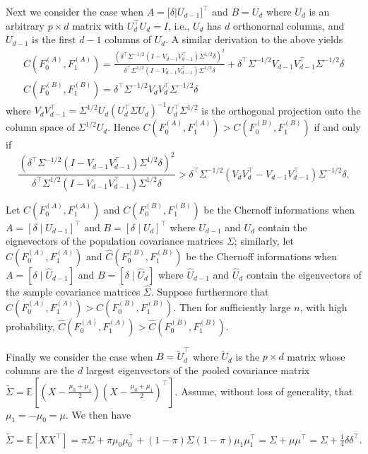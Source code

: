 \documentclass[10pt]{article}
\begin{document}
 Next we consider the case when $A = \bigl[ \delta | U_{d-1} \bigr]^{\top}$ and $B = U_{d}$ where $U_{d}$ is an arbitrary $p \times d$ matrix with $U_d^{\top} U_d = I$, i.e., $U_d$ has $d$ orthonornal columns, and $U_{d-1}$ is the first $d-1$ columns of $U_d$. A similar derivation to the above yields
 \begin{gather}
 C(F_0^{(A)}, F_1^{(A)}) = \frac{(\delta^{\top} \Sigma^{-1/2} (I - V_{d-1} V_{d-1}^{\top}) \Sigma^{1/2} \delta)^2}{\delta^{\top} \Sigma^{1/2} (I - V_{d-1} V_{d-1}^{\top}) \Sigma^{1/2} \delta} + \delta^{\top} \Sigma^{-1/2} V_{d-1} V_{d-1}^{\top} \Sigma^{-1/2} \delta \\
 C(F_0^{(B)}, F_1^{(B)}) = \delta^{\top} \Sigma^{-1/2} V_d V_d^{\top} \Sigma^{-1/2} \delta
 \end{gather}
 where $V_{d} V_{d-1}^{\top} = \Sigma^{1/2} U_d (U_d^{\top} \Sigma U_d)^{-1} U_d^{\top} \Sigma^{1/2}$ is the orthogonal projection onto the column space of $\Sigma^{1/2} U_d$. Hence $C(F_0^{(A)}, F_1^{(A)}) > C(F_0^{(B)}, F_1^{(B)})$ if and only if
 $$ \frac{(\delta^{\top} \Sigma^{-1/2} (I - V_{d-1} V_{d-1}^{\top}) \Sigma^{1/2} \delta)^2}{\delta^{\top} \Sigma^{1/2} (I - V_{d-1} V_{d-1}^{\top}) \Sigma^{1/2} \delta} > \delta^{\top} \Sigma^{-1/2} (V_d V_d^{\top} - V_{d-1} V_{d-1}^{\top}) \Sigma^{-1/2} \delta. $$

Let $C(F_0^{(A)}, F_1^{(A)})$ and $C(F_0^{(B)}, F_1^{(B)})$ be the Chernoff informations when $A = [\delta \mid U_{d-1}]^{\top}$ and $B = [\delta \mid U_d]^{\top}$ where $U_{d-1}$ and $U_d$ contain the eignevectors of the population covariance matrices $\Sigma$; similarly, let $\hat{C}(F_0^{(A)}, F_1^{(A)})$ and $\hat{C}(F_0^{(B)}, F_1^{(B)})$ be the Chernoff informations when $A = [\delta \mid \hat{U}_{d-1}]$ and $B = [\delta \mid \hat{U}_d]$ where $\hat{U}_{d-1}$ and $\hat{U}_d$ contain the eigenvectors of the {\emph sample} covariance matrices $\hat{\Sigma}$. Suppose furthermore that $C(F_0^{(A)}, F_1^{(A)}) > C(F_0^{(B)}, F_1^{(B)})$. Then for sufficiently large $n$, with high probability, $\hat{C}(F_0^{(A)}, F_1^{(A)}) > \hat{C}(F_0^{(B)}, F_1^{(B)})$. 

Finally we consider the case when $B = \tilde{U}_d^{\top}$ where $\tilde{U}_d$ is the $p \times d$ matrix whose columns are the $d$ largest eigenvectors of the {\emph pooled} covariance matrix $\tilde{\Sigma} = \mathbb{E}[(X - \tfrac{\mu_0 + \mu_1}{2})(X - \tfrac{\mu_0 + \mu_1}{2})^{\top}]$. Assume, without loss of generality, that $\mu_1 = -\mu_0 = \mu$. We then have

$$\tilde{\Sigma} = \mathbb{E}[X X^{\top}] = \pi \Sigma + \pi \mu_0 \mu_0^{\top} + (1 - \pi) \Sigma (1 - \pi) \mu_1 \mu_1^{\top} = \Sigma + \mu \mu^{\top} = \Sigma + \tfrac{1}{4} \delta \delta^{\top}. $$
\end{document}
